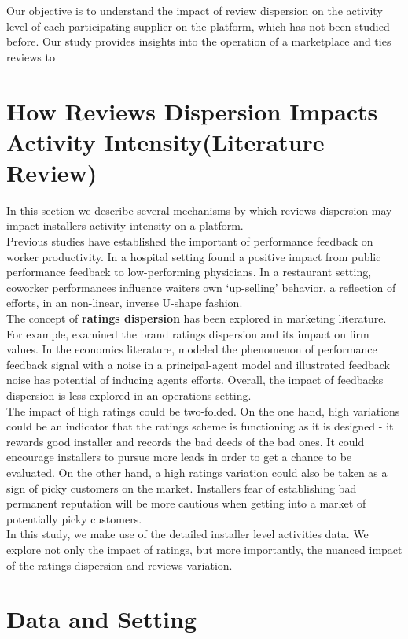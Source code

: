 \documentclass[msom,blindrev]{informs3}
\begin{document}
Our objective is to understand the impact of review dispersion on the activity level of each participating supplier on the platform, which has not been studied before. Our study provides insights into the operation of a marketplace and ties reviews to



\section{How Reviews Dispersion Impacts Activity Intensity(Literature Review) }
 In this section we describe several mechanisms by which reviews dispersion may impact installers activity intensity on a platform. \\
 Previous studies have established the important of performance feedback on worker productivity. In a hospital setting \cite{song2017closing} found a positive impact from public performance feedback to low-performing physicians. In a restaurant setting, coworker performances influence waiters own `up-selling' behavior, a reflection of efforts, in an non-linear, inverse U-shape fashion. \\ 
The concept of \textbf{ratings dispersion} has been explored in marketing literature. For example, \cite{luo2013impact} examined the brand ratings dispersion and its impact on firm values. In the economics literature, \cite{marinovic2015credibility} modeled the phenomenon of performance feedback signal with a noise in a principal-agent model and illustrated feedback noise has potential of inducing agents efforts. Overall, the impact of feedbacks dispersion is less explored in an operations setting. \\
The impact of high ratings could be two-folded. On the one hand, high variations could be an indicator that the ratings scheme is functioning as it is designed - it rewards good installer and records the bad deeds of the bad ones. It could encourage installers to pursue more leads in order to get a chance to be evaluated. 
On the other hand, a high ratings variation could also be taken as a sign of picky customers on the market. Installers fear of establishing bad permanent reputation will be more cautious when getting into a market of potentially picky customers. \\ 
In this study, we make use of the detailed installer level activities data. We explore not only the impact of ratings, but more importantly, the nuanced impact of the ratings dispersion and reviews variation. 


\section{Data and Setting}
\end{document}
